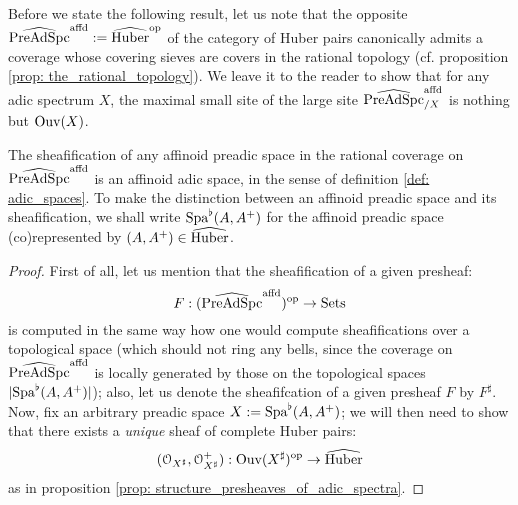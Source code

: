                     \begin{remark}
                        Before we state the following result, let us note that the opposite $\widehat{\mathrm{Pre}\mathrm{Ad}\mathrm{Spc}}^{\mathrm{affd}} := \widehat{\mathrm{Huber}}^{\mathrm{op}}$ of the category of Huber pairs canonically admits a coverage whose covering sieves are covers in the rational topology (cf. proposition \ref{prop: the_rational_topology}). We leave it to the reader to show that for any adic spectrum $X$, the maximal small site of the large site $\widehat{\mathrm{Pre}\mathrm{Ad}\mathrm{Spc}}^{\mathrm{affd}}_{/X}$ is nothing but $\mathrm{Ouv}(X)$.
                    \end{remark}
                    \begin{theorem} \label{theorem: sheafifying_pre_adic_spaces}
                        The sheafification of any affinoid preadic space in the rational coverage on $\widehat{\mathrm{Pre}\mathrm{Ad}\mathrm{Spc}}^{\mathrm{affd}}$ is an affinoid adic space, in the sense of definition \ref{def: adic_spaces}. To make the distinction between an affinoid preadic space and its sheafification, we shall write $\mathrm{Spa}^{\flat}(A, A^+)$ for the affinoid preadic space (co)represented by $(A, A^+) \in \widehat{\mathrm{Huber}}$.
                    \end{theorem}
                        \begin{proof}
                            First of all, let us mention that the sheafification of a given presheaf:
                                $$F: (\widehat{\mathrm{Pre}\mathrm{Ad}\mathrm{Spc}}^{\mathrm{affd}})^{\mathrm{op}} \to \mathrm{Sets}$$
                            is computed in the same way how one would compute sheafifications over a topological space (which should not ring any bells, since the coverage on $\widehat{\mathrm{Pre}\mathrm{Ad}\mathrm{Spc}}^{\mathrm{affd}}$ is locally generated by those on the topological spaces $|\mathrm{Spa}^{\flat}(A, A^+)|$); also, let us denote the sheafifcation of a given presheaf $F$ by $F^{\sharp}$. Now, fix an arbitrary preadic space $X := \mathrm{Spa}^{\flat}(A, A^+)$; we will then need to show that there exists a \textit{unique} sheaf of complete Huber pairs:
                                $$(\mathcal{O}_{X^{\sharp}}, \mathcal{O}_{X^{\sharp}}^+): \mathrm{Ouv}(X^{\sharp})^{\mathrm{op}} \to \widehat{\mathrm{Huber}}$$
                            as in proposition \ref{prop: structure_presheaves_of_adic_spectra}. 
                        \end{proof}
                    \begin{example}
                        
                    \end{example}
                
